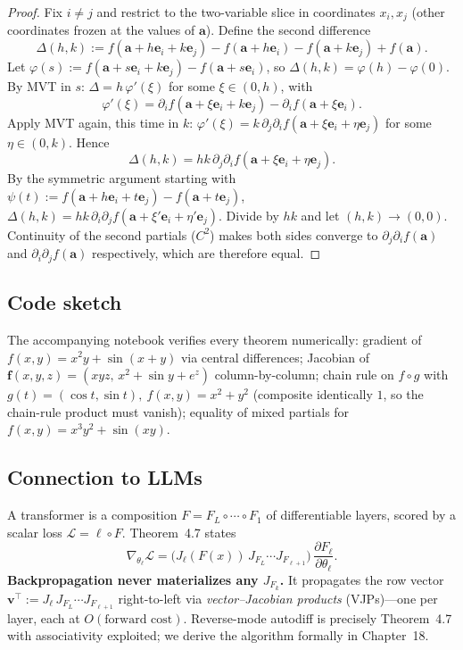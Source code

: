 \begin{proof}
Fix $i\neq j$ and restrict to the two-variable slice in coordinates $x_i,x_j$ (other coordinates frozen at the values of $\mathbf{a}$). Define the second difference
\[
\Delta(h,k) := f(\mathbf{a}+h\mathbf{e}_i+k\mathbf{e}_j) - f(\mathbf{a}+h\mathbf{e}_i) - f(\mathbf{a}+k\mathbf{e}_j) + f(\mathbf{a}).
\]
Let $\varphi(s):=f(\mathbf{a}+s\mathbf{e}_i+k\mathbf{e}_j)-f(\mathbf{a}+s\mathbf{e}_i)$, so $\Delta(h,k)=\varphi(h)-\varphi(0)$. By MVT in $s$: $\Delta=h\,\varphi'(\xi)$ for some $\xi\in(0,h)$, with
\[
\varphi'(\xi) = \partial_i f(\mathbf{a}+\xi\mathbf{e}_i+k\mathbf{e}_j) - \partial_i f(\mathbf{a}+\xi\mathbf{e}_i).
\]
Apply MVT again, this time in $k$: $\varphi'(\xi)=k\,\partial_j\partial_i f(\mathbf{a}+\xi\mathbf{e}_i+\eta\mathbf{e}_j)$ for some $\eta\in(0,k)$. Hence
\[
\Delta(h,k) = hk\,\partial_j\partial_i f(\mathbf{a}+\xi\mathbf{e}_i+\eta\mathbf{e}_j).
\]
By the symmetric argument starting with $\psi(t):=f(\mathbf{a}+h\mathbf{e}_i+t\mathbf{e}_j)-f(\mathbf{a}+t\mathbf{e}_j)$, $\Delta(h,k)=hk\,\partial_i\partial_j f(\mathbf{a}+\xi'\mathbf{e}_i+\eta'\mathbf{e}_j)$. Divide by $hk$ and let $(h,k)\to(0,0)$. Continuity of the second partials ($C^2$) makes both sides converge to $\partial_j\partial_i f(\mathbf{a})$ and $\partial_i\partial_j f(\mathbf{a})$ respectively, which are therefore equal.
\end{proof}

\subsection*{Code sketch}

The accompanying notebook verifies every theorem numerically: gradient of $f(x,y)=x^2y+\sin(x+y)$ via central differences; Jacobian of $\mathbf{f}(x,y,z)=(xyz,\,x^2+\sin y+e^z)$ column-by-column; chain rule on $f\circ g$ with $g(t)=(\cos t,\sin t),\ f(x,y)=x^2+y^2$ (composite identically $1$, so the chain-rule product must vanish); equality of mixed partials for $f(x,y)=x^3y^2+\sin(xy)$.

\subsection*{Connection to LLMs}

A transformer is a composition $F = F_L\circ\cdots\circ F_1$ of differentiable layers, scored by a scalar loss $\mathcal{L}=\ell\circ F$. Theorem~4.7 states
\[
\nabla_{\theta_\ell}\mathcal{L} = \big(J_\ell(F(x))\,J_{F_L}\cdots J_{F_{\ell+1}}\big)\,\frac{\partial F_\ell}{\partial \theta_\ell}.
\]
\textbf{Backpropagation never materializes any $J_{F_k}$.} It propagates the row vector $\mathbf{v}^\top := J_\ell\,J_{F_L}\cdots J_{F_{\ell+1}}$ right-to-left via \emph{vector--Jacobian products} (VJPs)---one per layer, each at $O(\text{forward cost})$. Reverse-mode autodiff is precisely Theorem~4.7 with associativity exploited; we derive the algorithm formally in Chapter~18.
